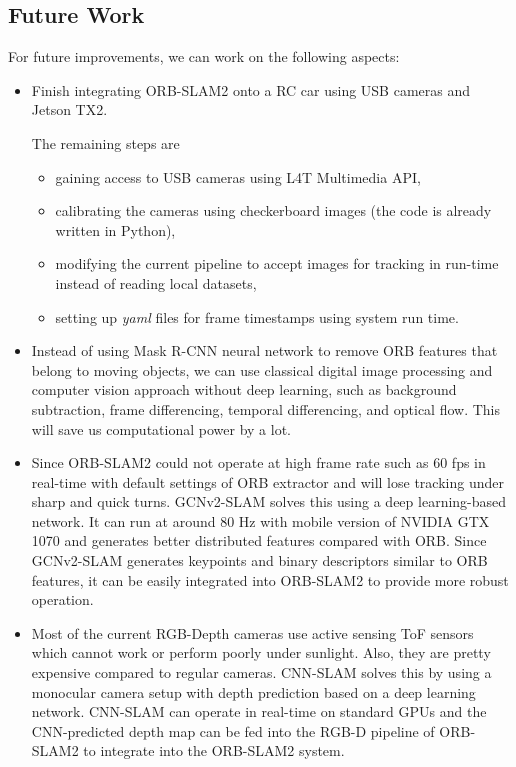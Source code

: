 \documentclass[letterpaper, 10 pt, conference]{IEEEtran}
\begin{document}
\subsection{Future Work} \label{sect:\thesubsection}
For future improvements, we can work on the following aspects: 
\begin{itemize}
    \item Finish integrating ORB-SLAM2 onto a RC car using USB cameras and
    Jetson TX2. 
    
    The remaining steps are 
    \begin{itemize}
        \item gaining access to USB cameras using L4T Multimedia API,
        \item calibrating the cameras using checkerboard images (the code is
        already written in Python),
        \item modifying the current pipeline to accept images for tracking in
        run-time instead of reading local datasets,
        \item setting up \textit{yaml} files for frame timestamps using system
        run time. 
    \end{itemize}
    \item Instead of using Mask R-CNN neural network to remove ORB features that
    belong to moving objects, we can use classical digital image processing and
    computer vision approach without deep learning, such as background
    subtraction, frame differencing, temporal differencing, and optical flow.
    This will save us computational power by a lot. 
    \item Since ORB-SLAM2 could not operate at high frame rate such as 60 fps
    in real-time with default settings of ORB extractor and will lose tracking
    under sharp and quick turns. GCNv2-SLAM \cite{c19} solves this using a deep
    learning-based network. It can run at around 80 Hz with mobile version of
    NVIDIA GTX 1070 and generates better distributed features compared with ORB.
    Since GCNv2-SLAM generates keypoints and binary descriptors similar to ORB
    features, it can be easily integrated into ORB-SLAM2 to provide more robust
    operation. 
    \item Most of the current RGB-Depth cameras use active sensing ToF sensors
    which cannot work or perform poorly under sunlight. Also, they are pretty
    expensive compared to regular cameras. CNN-SLAM \cite{c20} solves this by
    using a monocular camera setup with depth prediction based on a deep
    learning network. CNN-SLAM can operate in real-time on standard GPUs and the
    CNN-predicted depth map can be fed into the RGB-D pipeline of ORB-SLAM2 to
    integrate into the ORB-SLAM2 system. 
\end{itemize}



\end{document}

